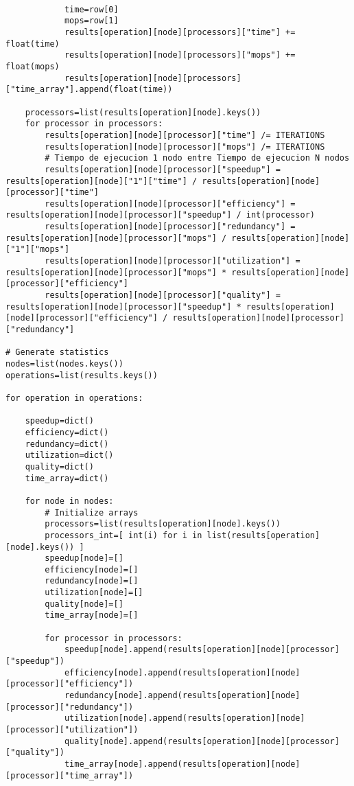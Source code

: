 \begin{center}
\begin{footnotesize}
\begin{verbatim}
            
            time=row[0]
            mops=row[1]
            results[operation][node][processors]["time"] += float(time)
            results[operation][node][processors]["mops"] += float(mops)
            results[operation][node][processors]["time_array"].append(float(time))
    
    processors=list(results[operation][node].keys())
    for processor in processors:
        results[operation][node][processor]["time"] /= ITERATIONS
        results[operation][node][processor]["mops"] /= ITERATIONS
        # Tiempo de ejecucion 1 nodo entre Tiempo de ejecucion N nodos
        results[operation][node][processor]["speedup"] = results[operation][node]["1"]["time"] / results[operation][node][processor]["time"] 
        results[operation][node][processor]["efficiency"] = results[operation][node][processor]["speedup"] / int(processor)
        results[operation][node][processor]["redundancy"] = results[operation][node][processor]["mops"] / results[operation][node]["1"]["mops"] 
        results[operation][node][processor]["utilization"] = results[operation][node][processor]["mops"] * results[operation][node][processor]["efficiency"]
        results[operation][node][processor]["quality"] = results[operation][node][processor]["speedup"] * results[operation][node][processor]["efficiency"] / results[operation][node][processor]["redundancy"]

# Generate statistics
nodes=list(nodes.keys())
operations=list(results.keys())

for operation in operations:
    
    speedup=dict()
    efficiency=dict()
    redundancy=dict()
    utilization=dict()
    quality=dict()
    time_array=dict()

    for node in nodes:   
        # Initialize arrays
        processors=list(results[operation][node].keys())
        processors_int=[ int(i) for i in list(results[operation][node].keys()) ]
        speedup[node]=[]
        efficiency[node]=[]
        redundancy[node]=[]
        utilization[node]=[]
        quality[node]=[]
        time_array[node]=[]
        
        for processor in processors:
            speedup[node].append(results[operation][node][processor]["speedup"])
            efficiency[node].append(results[operation][node][processor]["efficiency"])
            redundancy[node].append(results[operation][node][processor]["redundancy"])
            utilization[node].append(results[operation][node][processor]["utilization"])
            quality[node].append(results[operation][node][processor]["quality"])
            time_array[node].append(results[operation][node][processor]["time_array"])
    

\end{verbatim}
\end{footnotesize}
\end{center}
